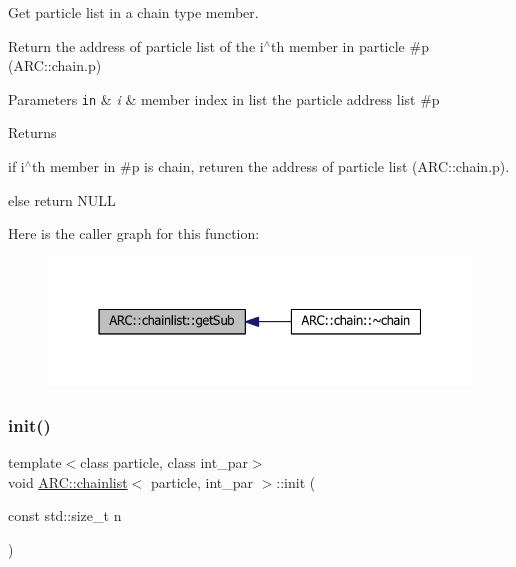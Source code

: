 Get particle list in a chain type member. 

Return the address of particle list of the i$^\wedge$th member in particle \#p (A\+R\+C\+::chain.\+p) 
\begin{DoxyParams}[1]{Parameters}
\mbox{\tt in}  & {\em i} & member index in list the particle address list \#p \\
\hline
\end{DoxyParams}
\begin{DoxyReturn}{Returns}

\begin{DoxyItemize}
\item if i$^\wedge$th member in \#p is chain, returen the address of particle list (A\+R\+C\+::chain.\+p).
\item else return N\+U\+LL 
\end{DoxyItemize}
\end{DoxyReturn}
Here is the caller graph for this function\+:
\nopagebreak
\begin{figure}[H]
\begin{center}
\leavevmode
\includegraphics[width=331pt]{classARC_1_1chainlist_a4ded066f2323845befd92b1109ccdeb0_icgraph}
\end{center}
\end{figure}
\hypertarget{classARC_1_1chainlist_a82f296c7288678df8c279958304e58d8}{}\label{classARC_1_1chainlist_a82f296c7288678df8c279958304e58d8} 
\subsubsection{\texorpdfstring{init()}{init()}}
{\footnotesize\ttfamily template$<$class particle, class int\+\_\+par$>$ \\
void \hyperlink{classARC_1_1chainlist}{A\+R\+C\+::chainlist}$<$ particle, int\+\_\+par $>$\+::init (\begin{DoxyParamCaption}\item[{const std\+::size\+\_\+t}]{n }\end{DoxyParamCaption})\hspace{0.3cm}{\ttfamily [inline]}}



